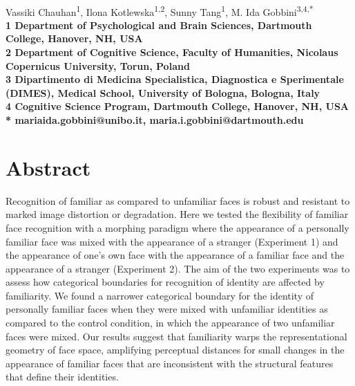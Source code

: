 \documentclass[10pt,letterpaper]{article}
\begin{document}
\vspace*{0.35in}

\begin{flushleft}
{\Large
\textbf{}
}
\newline
\\
Vassiki Chauhan\textsuperscript{1},
Ilona Kotlewska\textsuperscript{1,2},
Sunny Tang\textsuperscript{1},
M. Ida Gobbini\textsuperscript{3,4,*}
\\
\bigskip
\bf{1} Department of Psychological and Brain Sciences, Dartmouth College, Hanover, NH, USA
\\
\bf{2} Department of Cognitive Science, Faculty of Humanities, Nicolaus Copernicus University, Torun, Poland
\\
\bf{3} Dipartimento di Medicina Specialistica, Diagnostica e Sperimentale (DIMES), Medical School, University of Bologna, Bologna, Italy
\\
\bf{4} Cognitive Science Program, Dartmouth College, Hanover, NH, USA
\\
\bigskip
* mariaida.gobbini@unibo.it, maria.i.gobbini@dartmouth.edu

\end{flushleft}

\section*{Abstract}
Recognition of familiar as compared to unfamiliar faces is robust and resistant to marked image distortion or degradation. Here we tested the flexibility of familiar face recognition with a morphing paradigm where the appearance of a personally familiar face was mixed with the appearance of a stranger (Experiment 1) and the appearance of one’s own face with the appearance of a familiar face and the appearance of a stranger (Experiment 2).  The aim of the two experiments was to assess how categorical boundaries for recognition of identity are affected by familiarity. We found a narrower categorical boundary for the identity of personally familiar faces when they were mixed with unfamiliar identities as compared to the control condition, in which the appearance of two unfamiliar faces were mixed. Our results suggest that familiarity warps the representational geometry of face space, amplifying perceptual distances for small changes in the appearance of familiar faces that are inconsistent with the structural features that define their identities.
\end{document}
